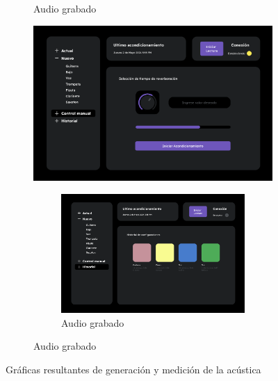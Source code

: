 \begin{figure}[!htb]
\begin{subfigure}{0.3\textwidth}
        \caption{\footnotesize Audio grabado}
        \label{fig:sub2}
    \end{subfigure}
    \hfill
    \begin{subfigure}{0.3\textwidth}
        \centering
        \includegraphics[width=\linewidth]{imagenes/Control Manual.png}
        \caption{\footnotesize Respuesta al impulso estimada}
        \label{fig:sub2}
    \begin{subfigure}{0.3\textwidth}
        \centering
        \includegraphics[width=\linewidth]{imagenes/Historial.png}
        \caption{\footnotesize Audio grabado}
        \label{fig:sub2}
    \end{subfigure}
    \hfill
    \end{subfigure}
    \caption{Gráficas resultantes de generación y medición de la acústica}
\end{figure}
\FloatBarrier


